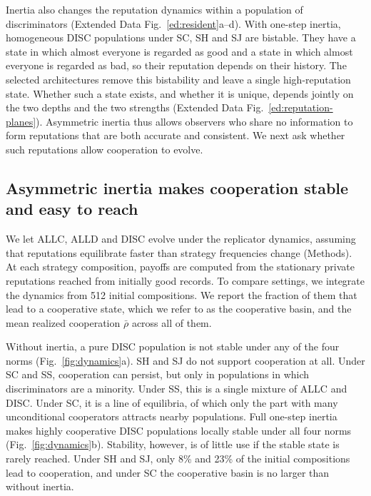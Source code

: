 \documentclass[10pt]{wlscirep}
\theoremstyle{plain}
\theoremstyle{remark}
\begin{document}
Inertia also changes the reputation dynamics within a population of discriminators (Extended Data Fig.~\ref{ed:resident}a--d). With one-step inertia, homogeneous DISC populations under SC, SH and SJ are bistable. They have a state in which almost everyone is regarded as good and a state in which almost everyone is regarded as bad, so their reputation depends on their history. The selected architectures remove this bistability and leave a single high-reputation state. Whether such a state exists, and whether it is unique, depends jointly on the two depths and the two strengths (Extended Data Fig.~\ref{ed:reputation-planes}). Asymmetric inertia thus allows observers who share no information to form reputations that are both accurate and consistent. We next ask whether such reputations allow cooperation to evolve.

\subsection*{Asymmetric inertia makes cooperation stable and easy to reach}

We let ALLC, ALLD and DISC evolve under the replicator dynamics\cite{hofbauer1998}, assuming that reputations equilibrate faster than strategy frequencies change (Methods). At each strategy composition, payoffs are computed from the stationary private reputations reached from initially good records. To compare settings, we integrate the dynamics from 512 initial compositions. We report the fraction of them that lead to a cooperative state, which we refer to as the cooperative basin, and the mean realized cooperation $\bar\rho$ across all of them.

Without inertia, a pure DISC population is not stable under any of the four norms (Fig.~\ref{fig:dynamics}a). SH and SJ do not support cooperation at all. Under SC and SS, cooperation can persist, but only in populations in which discriminators are a minority. Under SS, this is a single mixture of ALLC and DISC. Under SC, it is a line of equilibria, of which only the part with many unconditional cooperators attracts nearby populations. Full one-step inertia makes highly cooperative DISC populations locally stable under all four norms (Fig.~\ref{fig:dynamics}b). Stability, however, is of little use if the stable state is rarely reached. Under SH and SJ, only 8\% and 23\% of the initial compositions lead to cooperation, and under SC the cooperative basin is no larger than without inertia.
\end{document}
